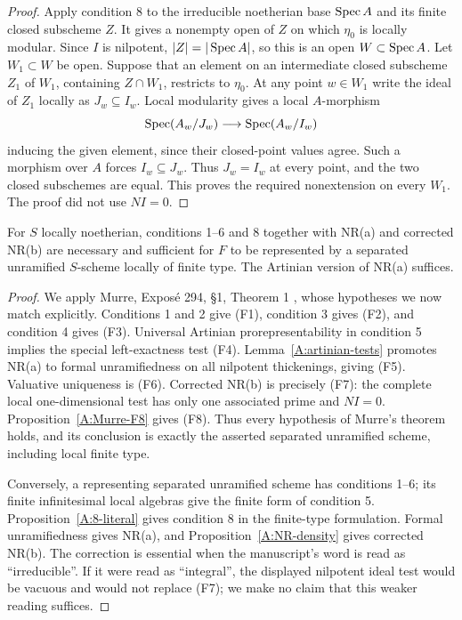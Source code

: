 \begin{proof}
Apply condition 8 to the irreducible noetherian base $\operatorname{Spec} A$ and
its finite closed subscheme $Z$. It gives a nonempty open of $Z$
on which $\eta_0$ is locally modular. Since $I$ is nilpotent,
$|Z|=|\operatorname{Spec} A|$, so this is an open $W\subset\operatorname{Spec} A$.
Let $W_1\subset W$ be open. Suppose that an element on an
intermediate closed subscheme $Z_1$ of $W_1$, containing
$Z\cap W_1$, restricts to $\eta_0$. At any point $w\in W_1$
write the ideal of $Z_1$ locally as $J_w\subseteq I_w$.
Local modularity gives a local $A$-morphism
\[
 \operatorname{Spec}(A_w/J_w)\longrightarrow\operatorname{Spec}(A_w/I_w)
\]
inducing the given element, since their closed-point values agree.
Such a morphism over $A$ forces $I_w\subseteq J_w$.
Thus $J_w=I_w$ at every point, and the two closed subschemes are
equal. This proves the required nonextension on every $W_1$.
The proof did not use $NI=0$.
\end{proof}

\begin{corollary}
\label{A:unramified-corollary}
For $S$ locally noetherian, conditions 1--6 and 8 together with
NR(a) and corrected NR(b) are necessary and sufficient for $F$ to
be represented by a separated unramified $S$-scheme locally of
finite type. The Artinian version of NR(a) suffices.
\end{corollary}
\begin{proof}
We apply Murre, Expos\'e 294, \S1, Theorem 1
\cite{Murre1965}, whose hypotheses we now match explicitly.
Conditions 1 and 2 give (F1), condition 3 gives (F2), and
condition 4 gives (F3). Universal Artinian prorepresentability
in condition 5 implies the special left-exactness test (F4).
Lemma~\ref{A:artinian-tests} promotes NR(a) to formal
unramifiedness on all nilpotent thickenings, giving (F5).
Valuative uniqueness is (F6). Corrected NR(b) is precisely (F7):
the complete local one-dimensional test has only one associated
prime and $NI=0$. Proposition~\ref{A:Murre-F8} gives (F8).
Thus every hypothesis of Murre's theorem holds, and its conclusion
is exactly the asserted separated unramified scheme, including
local finite type.

Conversely, a representing separated unramified scheme has
conditions 1--6; its finite infinitesimal local algebras give the
finite form of condition 5. Proposition~\ref{A:8-literal} gives
condition 8 in the finite-type formulation. Formal
unramifiedness gives NR(a), and
Proposition~\ref{A:NR-density} gives corrected NR(b).
The correction is essential when the manuscript's word is read
as ``irreducible''. If it were read as ``integral'', the displayed
nilpotent ideal test would be vacuous and would not replace (F7);
we make no claim that this weaker reading suffices.
\end{proof}

